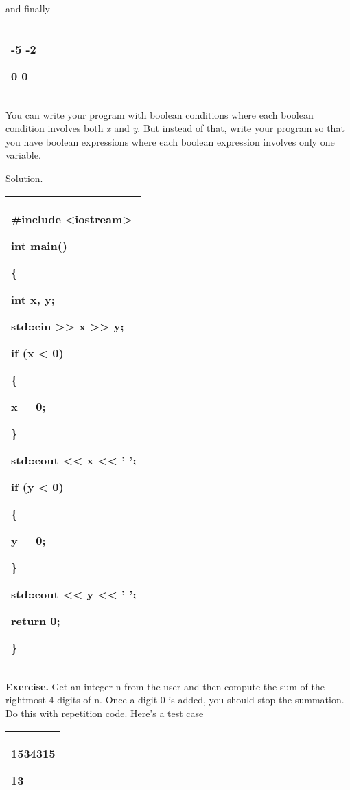\documentclass[
]{article}
\begin{document}
and finally

\begin{longtable}[]{@{}l@{}}
\toprule
\endhead
\begin{minipage}[t]{0.97\columnwidth}\raggedright
-5 -2

0 0\strut
\end{minipage}\tabularnewline
\bottomrule
\end{longtable}

You can write your program with boolean conditions where each boolean
condition involves both \emph{x} and \emph{y}. But instead of that,
write your program so that you have boolean expressions where each
boolean expression involves only one variable.

\protect\hypertarget{anchor-2}{}{}Solution.

\begin{longtable}[]{@{}l@{}}
\toprule
\endhead
\begin{minipage}[t]{0.97\columnwidth}\raggedright
\#include \textless iostream\textgreater{}

int main()

\{

int x, y;

std::cin \textgreater\textgreater{} x \textgreater\textgreater{} y;

if (x \textless{} 0)

\{

x = 0;

\}

std::cout \textless\textless{} x \textless\textless{} ' ';

if (y \textless{} 0)

\{

y = 0;

\}

std::cout \textless\textless{} y \textless\textless{} ' ';

return 0;

\}\strut
\end{minipage}\tabularnewline
\bottomrule
\end{longtable}

\textbf{Exercise.} Get an integer n from the user and then compute the
sum of the rightmost 4 digits of n. Once a digit 0 is added, you should
stop the summation. Do this with repetition code. Here's a test case

\begin{longtable}[]{@{}l@{}}
\toprule
\endhead
\begin{minipage}[t]{0.97\columnwidth}\raggedright
\textbf{1534315}

13\strut
\end{minipage}\tabularnewline
\bottomrule
\end{longtable}
\end{document}
